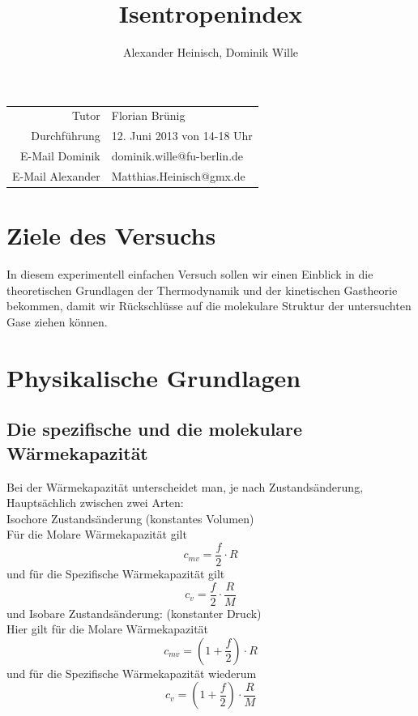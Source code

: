 \documentclass{article}
\title{Isentropenindex}
\author{Alexander Heinisch, Dominik Wille}
\begin{document}
\maketitle

\vspace{13cm}
\noindent
\begin{center}
\begin{tabular}{r l}
Tutor & Florian Brünig\\
Durchführung & 12. Juni 2013 von 14-18 Uhr \\

E-Mail Dominik & dominik.wille@fu-berlin.de \\
E-Mail Alexander & Matthias.Heinisch@gmx.de \\
\end{tabular}
\end{center}

\newpage
\tableofcontents
\newpage

\section{Ziele des Versuchs}
In diesem experimentell einfachen Versuch sollen wir einen Einblick in die theoretischen Grundlagen der Thermodynamik und der kinetischen Gastheorie bekommen, damit wir Rückschlüsse auf die molekulare Struktur der untersuchten Gase ziehen können.

\section{Physikalische Grundlagen}

\subsection{Die spezifische und die molekulare Wärmekapazität}
Bei der Wärmekapazität unterscheidet man, je nach Zustandsänderung, Hauptsächlich zwischen zwei Arten: \\
{\sc Isochore Zustandsänderung} (konstantes Volumen) \\
Für die Molare Wärmekapazität gilt
\begin{equation}
c_{mv}=\frac{f}{2} \cdot R
\end{equation}
und für die Spezifische Wärmekapazität gilt
\begin{equation}
c_{v}= \frac{f}{2} \cdot \frac{R}{M}
\end{equation}
und {\sc Isobare Zustandsänderung}: (konstanter Druck)\\
Hier gilt für die Molare Wärmekapazität
\begin{equation}
c_{mv}= \left(1+ \frac{f}{2} \right) \cdot R
\end{equation}
und für die Spezifische Wärmekapazität wiederum
\begin{equation}
c_{v}= \left(1+ \frac{f}{2} \right) \cdot \frac{R}{M}
\end{equation}\\
\end{document}
